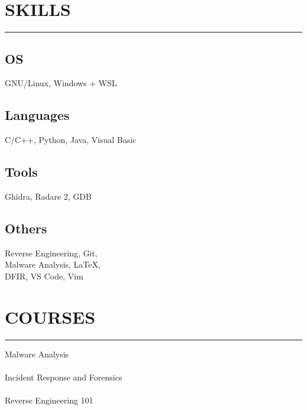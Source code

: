 \documentclass[]{resume}
\begin{document}
\begin{minipage}[t]{0.33\textwidth}

    \section{SKILLS}
    \noindent\rule{5 cm}{0.4pt}

    \subsection{OS}
    \noindent GNU/Linux, Windows + WSL

    \vspace{6pt}
    \subsection{Languages}
    \noindent C/C++, Python, Java, Visual Basic

    \vspace{6pt}
    \subsection{Tools}
    \noindent Ghidra, Radare 2, GDB

    \vspace{6pt}
    \subsection{Others}
    \noindent Reverse Engineering, Git,\\
    Malware Analysis, LaTeX,\\
    DFIR, VS Code, Vim


    \section{COURSES}
    \noindent\rule{5cm}{0.4pt}

    \noindent Malware Analysis\\
    \noindent {}\\

    \vspace{6pt}
    \noindent Incident Response and Forensics\\
    \noindent {}\\

    \vspace{6pt}
    \noindent Reverse Engineering 101\\
    \noindent {}\\

\end{minipage}
\end{document}

